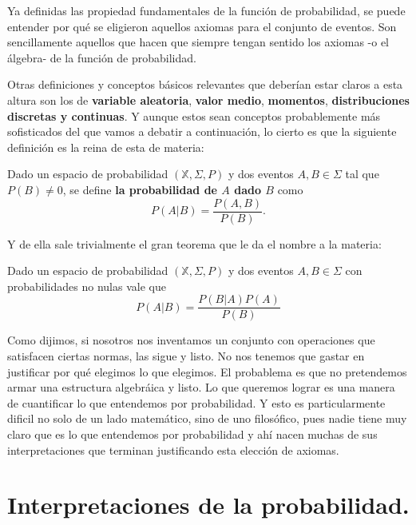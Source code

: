 Ya definidas las propiedad fundamentales de la función de probabilidad, se puede entender por qué se eligieron aquellos axiomas para el conjunto de eventos. Son sencillamente aquellos que hacen que siempre tengan sentido los axiomas -o el álgebra- de la función de probabilidad.

Otras definiciones y conceptos básicos relevantes que deberían estar claros a esta altura son los de {\bf variable aleatoria}, {\bf valor medio}, {\bf momentos}, {\bf distribuciones discretas y continuas}. Y aunque estos sean conceptos probablemente más sofisticados del que vamos a debatir a continuación, lo cierto es que la siguiente definición es la reina de esta de materia:
\begin{definition}
    Dado un espacio de probabilidad $(\mathbb{X},\Sigma,P)$ y dos eventos $A, B\in \Sigma$ tal que $P(B) \neq 0$, se define {\bf la probabilidad de $A$ dado $B$} como
    \begin{equation}
        P(A|B) = \frac{P(A,B)}{P(B)}.
    \end{equation}
\end{definition}
Y de ella sale trivialmente el gran teorema que le da el nombre a la materia:
\begin{theorem}
    Dado un espacio de probabilidad $(\mathbb{X},\Sigma,P)$ y dos eventos $A, B\in \Sigma$ con probabilidades no nulas vale que
    \begin{equation}
        P(A|B) = \frac{P(B|A)P(A)}{P(B)}
    \end{equation}
\end{theorem}

 Como dijimos, si nosotros nos inventamos un conjunto con operaciones que satisfacen ciertas normas, las sigue y listo. No nos tenemos que gastar en justificar por qué elegimos lo que elegimos. El probablema es que no pretendemos armar una estructura algebráica y listo. Lo que queremos lograr es una manera de cuantificar lo que entendemos por probabilidad. Y esto es particularmente dificil no solo de un lado matemático, sino de uno filosófico, pues nadie tiene muy claro que es lo que entendemos por probabilidad y ahí nacen muchas de sus interpretaciones que terminan justificando esta elección de axiomas.
\section{Interpretaciones de la probabilidad.}
